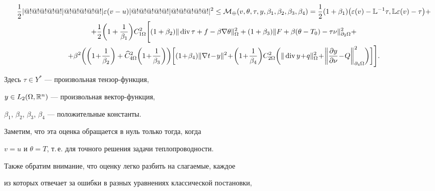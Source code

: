 \begin{gather*}


\frac{1}{2}\norme{\varepsilon(v-u)}^2 \le


{\cal M}_\oplus(v,\theta,\tau,y,\beta_1,\beta_2,\beta_3,\beta_4)= 


\frac{1}{2}(1+\beta_1)


\big(\varepsilon(v) -{\Bbb L}^{-1}\tau,


{\Bbb L}\varepsilon(v) - \tau\big)+ \\


%


+\frac{1}{2}\bigg(1+\frac{1}{\beta_1}\bigg) C_{1\Omega}^2 \Bigg[


(1+\beta_2)\norm{\Div \tau + f - \beta\nabla\theta}^2_{\Omega}+ 


(1+\beta_3)\norm{F+\beta(\theta-T_0)-\tau\nu}^2_{\partial_2\Omega} + \\


%


+\beta^2\bigg(\bigg(1\!+\!\frac{1}{\beta_2}\bigg)


+\widehat C_{4\Omega}^2 \bigg(1\!+\!\frac{1}{\beta_3}\bigg)\bigg)


\bigg[ (1\!+\!\beta_4) \norm{\nabla t\! -\! y}^2\!+\!




\bigg(1\!+\!\frac{1}{\beta_4} \bigg)


C_{2\Omega}^2 \bigg(\norm{\Div y\!+\!q}^2_{\Omega}\!+\!


\bigg\|\frac{\partial y}{\partial \nu}\!-\!Q\bigg\|^2_{\partial_4\Omega}


\bigg)\bigg]\Bigg].


\end{gather*}


Здесь $\tau\in Y^*$ --- произвольная тензор-функция,


$y\in L_2(\Omega,{\Bbb R}^n)$ --- произвольная вектор-функция,


$\beta_1$, $\beta_2$, $\beta_3$, $\beta_4$ --- положительные константы.


Заметим, что эта оценка обращается в нуль только тогда, когда


$v=u$ и $\theta=T$, т.\,е. для точного решения задачи теплопроводности.


Также обратим внимание, что оценку легко разбить на слагаемые, каждое


из которых отвечает за ошибки в разных уравнениях классической постановки,


